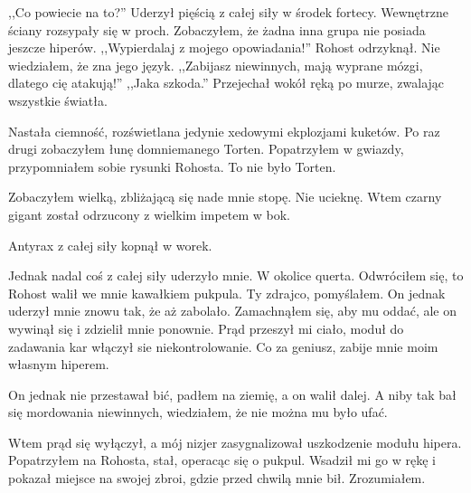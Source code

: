 \begin{dialogue}
\ds{} ,,Co powiecie na to?'' \dm{} Uderzył pięścią z całej siły w środek fortecy. Wewnętrzne ściany rozsypały się w proch. Zobaczyłem, że żadna inna grupa nie posiada jeszcze hiperów.
\ds{} ,,Wypierdalaj z mojego opowiadania!'' \dm{} Rohost odrzyknął. Nie wiedziałem, że zna jego język. \dm{} ,,Zabijasz niewinnych, mają wyprane mózgi, dlatego cię atakują!''
\ds{} ,,Jaka szkoda.'' \dm{} Przejechał wokół ręką po murze, zwalając wszystkie światła. 
\end{dialogue}
Nastała ciemność, rozświetlana jedynie xedowymi ekplozjami kuketów.
Po raz drugi zobaczyłem łunę domniemanego Torten.
Popatrzyłem w gwiazdy, przypomniałem sobie rysunki Rohosta.
To nie było Torten.

Zobaczyłem wielką, zbliżającą się nade mnie stopę.
Nie ucieknę.
Wtem czarny gigant został odrzucony z wielkim impetem w bok.

\divider{}

Antyrax z całej siły kopnął w worek.

\divider{}

Jednak nadal coś z całej siły uderzyło mnie. W okolice querta.
Odwróciłem się, to Rohost walił we mnie kawałkiem pukpula.
Ty zdrajco, pomyślałem.
On jednak uderzył mnie znowu tak, że aż zabolało.
Zamachnąłem się, aby mu oddać, ale on wywinął się i zdzielił mnie ponownie.
Prąd przeszył mi ciało, moduł do zadawania kar włączył sie niekontrolowanie. 
Co za geniusz, zabije mnie moim własnym hiperem.

On jednak nie przestawał bić, padłem na ziemię, a on walił dalej.
A niby tak bał się mordowania niewinnych, wiedziałem, że nie można mu było ufać.

Wtem prąd się wyłączył, a mój nizjer zasygnalizował uszkodzenie modułu hipera.
Popatrzyłem na Rohosta, stał, operacąc się o pukpul.
Wsadził mi go w rękę i pokazał miejsce na swojej zbroi, gdzie przed chwilą mnie bił.
Zrozumiałem.

